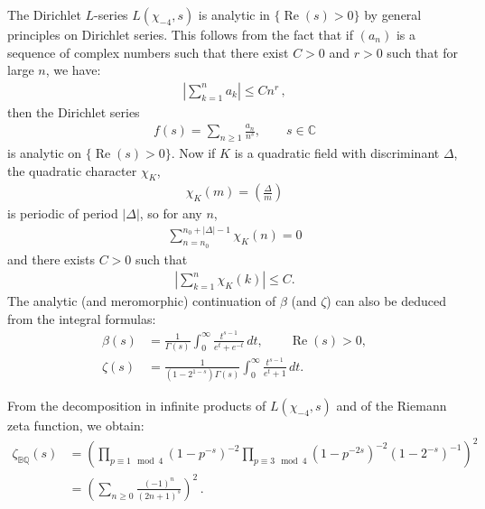 \documentclass[reqno]{amsart}
\theoremstyle{plain}
\theoremstyle{definition}
\theoremstyle{remark}
\numberwithin{equation}{section}
\begin{document}
\bigskip

The Dirichlet $L$-series $L(\chi_{-4},s)$ is analytic in
$\{{{\operatorname{Re}}}(s)>0\}$ by general principles on Dirichlet series. This follows
from the fact that if $(a_n)$ is a sequence of complex numbers such
that there exist $C>0$ and $r>0$ such that for large $n$, we have:
\begin{align*}
  \left|\sum_{k=1}^n a_k\right|\leq C n^r\,,
\end{align*}
then the Dirichlet series
\begin{align*}
  f(s) = \sum_{n\geq 1} \frac{a_n}{n^s},\qquad s\in{{\mathbb C}}
\end{align*}
is analytic on $\{{{\operatorname{Re}}}(s)>0\}$.  
Now if $K$ is a quadratic field with discriminant $\Delta$,
the quadratic character $\chi_K$,
\begin{align*}
  \chi_K(m)=\left(\frac\Delta m\right)
\end{align*}
is periodic of period $|\Delta|$, so for any $n$,
\begin{align*}
  \sum_{n=n_0}^{n_0+|\Delta|-1} \chi_K(n) =0
\end{align*}
and there exists $C>0$ such that
\begin{align*}
  \left|\sum_{k=1}^n \chi_K(k)\right|\leq C.
\end{align*}
The analytic (and meromorphic) continuation of $\beta$ (and $\zeta$)
can also be deduced from the integral formulas:
\begin{align*}
  \beta(s) &= \frac{1}{\Gamma(s)} \int_0^\infty \frac{t^{s-1}}{e^t + e^{-t}}\, dt,\qquad {{\operatorname{Re}}}(s)>0,\\
  \zeta(s) &= \frac{1}{(1-2^{1-s})\Gamma(s)} \int_0^\infty \frac{t^{s-1}}{e^t + 1}\, dt.
\end{align*}

From the decomposition in infinite products of $L(\chi_{-4},s)$ and of
the Riemann zeta function, we obtain:
\begin{align}
  \zeta_{{\mathbb B}{\mathbb Q}}(s) &= \left(\prod_{p\equiv 1\mod 4}\left(1-p^{-s}\right)^{-2}
                   \prod_{p\equiv 3\mod 4}\left(1-p^{-2s}\right)^{-2}\left(1-2^{-s}\right)^{-1}\right)^2\nonumber\\
                 &= \left( \sum_{n\geq 0} \frac{(-1)^n}{(2n+1)^s}\right)^2\,.
\end{align}

\bigskip
\end{document}
